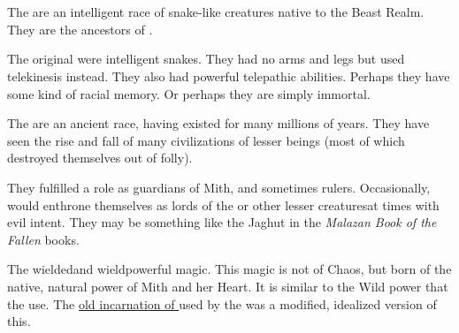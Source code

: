 \section{\Ophidians}
\label{Ophidians}



The \ophidians{} are an intelligent race of snake-like creatures native to the Beast Realm. They are the ancestors of \dragons. 



The original \ophidians{} were intelligent snakes. They had no arms and legs but used telekinesis instead. They also had powerful telepathic abilities. Perhaps they have some kind of racial memory. Or perhaps they are simply immortal. 


The \ophidians{} are an ancient race, having existed for many millions of years. They have seen the rise and fall of many civilizations of lesser beings (most of which destroyed themselves out of folly). 

They fulfilled a role as guardians of Mith, and sometimes rulers. Occasionally, \ophidians{} would enthrone themselves as lords of the \nephilim{} or other lesser creatures\dash at times with evil intent. They may be something like the Jaghut in the \emph{Malazan Book of the Fallen} books. 

\label{Ophidian power source}
The \ophidians{} wielded\dash and wield\dash powerful magic. This magic is not of Chaos, but born of the native, natural power of Mith and her Heart. It is similar to the Wild power that the  use. The \hyperref[Kezeradi Iquin]{old incarnation of \iquin} used by the \hs{\Kezeradi} was a modified, idealized version of this.

